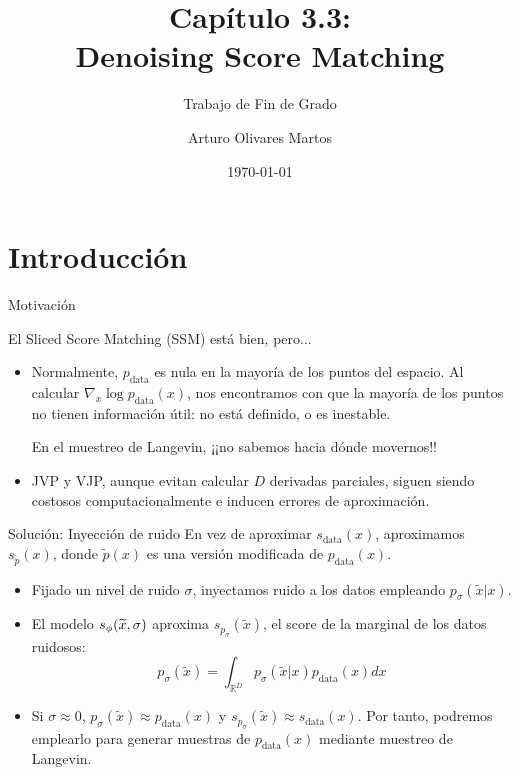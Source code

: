 \documentclass{beamer}
\title[3.3. DSM]{Capítulo 3.3:\\Denoising Score Matching}
\subtitle{Trabajo de Fin de Grado}
\author[Arturo]{Arturo Olivares Martos}
\institute[DGIIM - UGR]{Doble Grado en Ingeniería Informática y Matemáticas\\Universidad de Granada}
\date{\today}
\begin{document}
\begin{frame}
    \titlepage
\end{frame}

\section{Introducción}
\begin{frame}{Motivación}
    
    El Sliced Score Matching (SSM) está bien, pero...
    \begin{itemize}
        \item Normalmente, $p_{\text{data}}$ es nula en la mayoría de los puntos del espacio. Al calcular $\nabla_{x}\log p_{\text{data}}(x)$, nos encontramos con que la mayoría de los puntos no tienen información útil: no está definido, o es inestable.\pause
        
        En el muestreo de Langevin, ¡¡no sabemos hacia dónde movernos!!\pause
        \item JVP y VJP, aunque evitan calcular $D$ derivadas parciales, siguen siendo costosos computacionalmente e inducen errores de aproximación.
    \end{itemize}
\end{frame}

\begin{frame}{Solución: Inyección de ruido}
    En vez de aproximar $s_{\text{data}}(x)$, aproximamos $s_{\tilde{p}}(x)$, donde $\tilde{p}(x)$ es una versión modificada de $p_{\text{data}}(x)$. \pause
    \begin{itemize}
        \item Fijado un nivel de ruido $\sigma$, inyectamos ruido a los datos empleando $p_{\sigma}(\tilde{x}|x)$.\pause
        \item El modelo $s_{\phi}(\widetilde{x},\sigma)$ aproxima $s_{p_\sigma}(\tilde{x})$, el score de la marginal de los datos ruidosos:
        \begin{equation*}
            p_\sigma(\tilde{x}) = \int_{\mathbb{R}^D} p_{\sigma}(\tilde{x}|x)p_{\text{data}}(x)dx
        \end{equation*}\pause
        \item Si $\sigma\approx 0$, $p_\sigma(\tilde{x})\approx p_{\text{data}}(x)$ y $s_{p_\sigma}(\tilde{x})\approx s_{\text{data}}(x)$. Por tanto, podremos emplearlo para generar muestras de $p_{\text{data}}(x)$ mediante muestreo de Langevin.
    \end{itemize}
\end{frame}
\end{document}
